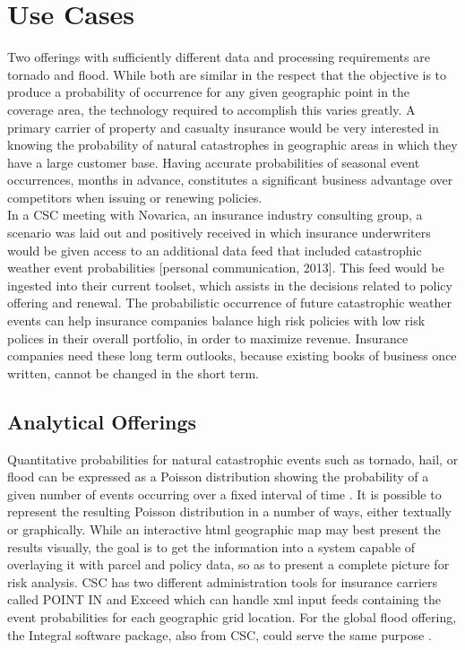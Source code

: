 \section{Use Cases}
Two offerings with sufficiently different data and processing requirements are tornado and flood. While both are similar in the respect that the objective is to produce a probability of occurrence for any given geographic point in the coverage area, the technology required to accomplish this varies greatly. A primary carrier of property and casualty insurance would be very interested in knowing the probability of natural catastrophes in geographic areas in which they have a large customer base. Having accurate probabilities of seasonal event occurrences, months in advance, constitutes a significant business advantage over competitors when issuing or renewing policies.\\

In a \textsc{CSC} meeting with Novarica, an insurance industry consulting group, a scenario was laid out and positively received in which insurance underwriters would be given access to an additional data feed that included catastrophic weather event probabilities [personal communication, 2013]. This feed would be ingested into their current toolset, which assists in the decisions related to policy offering and renewal. The probabilistic occurrence of future catastrophic weather events can help insurance companies balance high risk policies with low risk polices in their overall portfolio, in order to maximize revenue. Insurance companies need these long term outlooks, because existing books of business once written, cannot be changed in the short term.
\subsection{Analytical Offerings}
Quantitative probabilities for natural catastrophic events such as tornado, hail, or flood can be expressed as a Poisson distribution showing the probability of a given number of events occurring over a fixed interval of time \cite{anderson}. It is possible to represent the resulting Poisson distribution in a number of ways, either textually or graphically. While an interactive \gls{html} geographic map may best present the results visually, the goal is to get the information into a system capable of overlaying it with parcel and policy data, so as to present a complete picture for risk analysis. \textsc{CSC} has two different administration tools for insurance carriers called POINT IN and Exceed which can handle \gls{xml} input feeds containing the event probabilities for each geographic grid location. For the global flood offering, the Integral software package, also from \textsc{CSC}, could serve the same purpose \cite{integral}. \\

